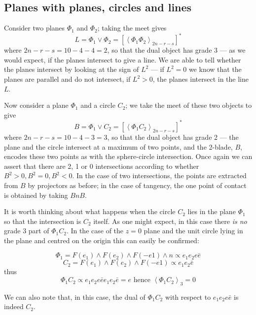 \subsection{Planes with planes, circles and lines }

Consider two planes $\Phi_1$ and $\Phi_2$; taking the
meet gives
%
\begin{equation}
L = \Phi_1 \vee \Phi_2 = \left[\left< \Phi_1 \Phi_2
\right>_{2n-r-s}\right]^*
\end{equation}
%
where $2n-r-s=10-4-4=2$, so that the dual object has
grade 3 --- as we would expect, if the planes intersect to
give a line. We are able to tell whether the planes
intersect by looking at the sign of $L^2$ --- if $L^2=0$
we know that the planes are parallel and do not
intersect, if $L^2>0$, the planes intersect in the line
$L$.

Now consider a plane $\Phi_1$ and a circle $C_2$; we take
the meet of these two objects to give
%
\begin{equation}
B = \Phi_1 \vee C_2 = \left[\left< \Phi_1 C_2
\right>_{2n-r-s}\right]^*
\end{equation}
%
where $2n-r-s=10-4-3=3$, so that the dual object has
grade 2 --- the plane and the circle intersect at a
maximum of two points, and the 2-blade, $B$, encodes these
two points as with the sphere-circle intersection. Once
again we can assert that there are 2, 1 or 0 intersections
according to whether $B^2>0, B^2=0, B^2<0$. In the case of
two intersections, the points are extracted from $B$ by
projectors as before; in the case of tangency, the
one point of contact is obtained by taking $BnB$.

It is worth thinking about what happens when the circle
$C_2$ lies in the plane $\Phi_1$ so that the intersection is
$C_2$ itself. As one might expect, in this case there \emph{is
no} grade 3 part of $\Phi_1C_2$. In the case of the $z=0$ plane and
the unit circle lying in the plane and centred on the origin this can
easily be confirmed:

\[
\Phi_1 = F(e_1) \wedge F(e_2) \wedge F(-e1) \wedge n \propto e_1e_2e\bar{e}
\]
\[
C_2 = F(e_1) \wedge F(e_2) \wedge F(-e1) \propto e_1e_2\bar{e}
\]
thus
\[
\Phi_1C_2 \propto e_1e_2e\bar{e}e_1e_2\bar{e} = e \mbox{ hence }
\left<\Phi_1C_2\right>_3 = 0
\]

We can also note that, in this case, the dual of $\Phi_1C_2$ with respect to
$e_1e_2e\bar{e}$ is indeed $C_2$.

